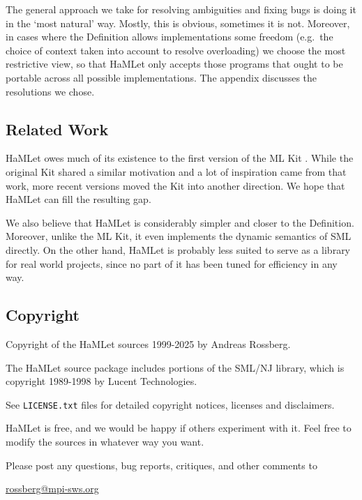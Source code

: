 \documentclass[twoside,titlepage]{article}
\begin{document}
The general approach we take for resolving ambiguities and fixing bugs is doing it in the `most natural' way. Mostly, this is obvious, sometimes it is not. Moreover, in cases where the Definition allows implementations some freedom (e.g.\ the choice of context taken into account to resolve overloading) we choose the most restrictive view, so that HaMLet only accepts those programs that ought to be portable across all possible implementations. The appendix discusses the resolutions we chose.


\subsection{Related Work}
\label{related}

HaMLet owes much of its existence to the first version of the ML Kit \cite{kit}. While the original Kit shared a similar motivation and a lot of inspiration came from that work, more recent versions moved the Kit into another direction. We hope that HaMLet can fill the resulting gap.

We also believe that HaMLet is considerably simpler and closer to the Definition. Moreover, unlike the ML Kit, it even implements the dynamic semantics of SML directly.
On the other hand, HaMLet is probably less suited to serve as a library for real world projects, since no part of it has been tuned for efficiency in any way.


\subsection{Copyright}
\label{copyright}

Copyright of the HaMLet sources 1999-2025 by Andreas Rossberg.

The HaMLet source package includes portions of the SML/NJ library, which is copyright 1989-1998 by Lucent Technologies.

See {\tt LICENSE.txt} files for detailed copyright notices, licenses and disclaimers.

HaMLet is free, and we would be happy if others experiment with it. Feel free to modify the sources in whatever way you want.

Please post any questions, bug reports, critiques, and other comments to

\begin{quoting}
\url{rossberg@mpi-sws.org}
\end{quoting}
\end{document}
